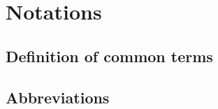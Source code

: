 \chapter{Notations}
\label{chapter:notations}
\pagestyle{localfancy}


\section{Definition of common terms}
\section{Abbreviations} 